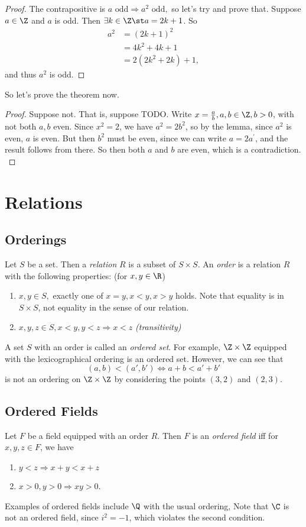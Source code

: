 \documentclass{notes}
\begin{document}
\begin{proof}
The contrapositive is $a\text{ odd}\Rightarrow a^2\text{ odd},$ so let's try and prove that. Suppose
$a\in\Z$ and $a$ is odd. Then $\exists k\in\Z \st a = 2k + 1$. So 
\begin{align*}
  a^2 &= (2k + 1)^2 \\
  &= 4k^2 + 4k + 1 \\
  &= 2(2k^2 + 2k) + 1,
\end{align*}
and thus $a^2$ is odd. 
\end{proof}

So let's prove the theorem now. 

\begin{proof}
  Suppose not. That is, suppose TODO. Write $x = \frac{a}{b}, a,b\in\Z,
  b >0$, with not both $a,b$ even. Since $x^2 = 2$, we have $a^2 = 2b^2$, so by the lemma, since $a^2$ 
  is even, $a$ is even. But then $b^2$ must be even, since we can write $a = 2a^\prime$, and the result
  follows from there. So then both $a$ and $b$ are even, which is a contradiction. \\
\end{proof}



\section{Relations}
\subsection{Orderings}
Let $S$ be a set. Then a \emph{relation} $R$ is a subset of $S\times S$. An \emph{order} is a relation
$R$ with the following properties: (for $x,y\in\R$)
\begin{enumerate}
\item $x,y\in S,$ exactly one of $x = y, x < y, x> y$ holds. Note that equality is in $S\times S$, not
  equality in the sense of our relation.
\item $x,y,z\in S, x<y, y<z \Rightarrow x<z$ \emph{(transitivity)}
\end{enumerate}

A set $S$ with an order is called an \emph{ordered set}. For example, $\Z\times\Z$ equipped with the
lexicographical ordering is an ordered set. However, we can see that $$(a,b) < (a', b') \Leftrightarrow
a + b < a' + b'$$ is not an ordering on $\Z\times\Z$ by considering the points $(3,2)$ and $(2,3)$. 

\subsection{Ordered Fields}
Let $F$ be a field equipped with an order $R$. Then $F$ is an \emph{ordered field} iff for $x,y,z\in F$, 
we have 
\begin{enumerate}
    \item $y < z \Rightarrow x+ y < x + z$
    \item $x > 0, y>0 \Rightarrow xy > 0$.
\end{enumerate}
Examples of ordered fields include $\Q$ with the usual ordering, Note that $\C$ is not an ordered field,
since $i^2 = -1$, which violates the second condition.
\end{document}
